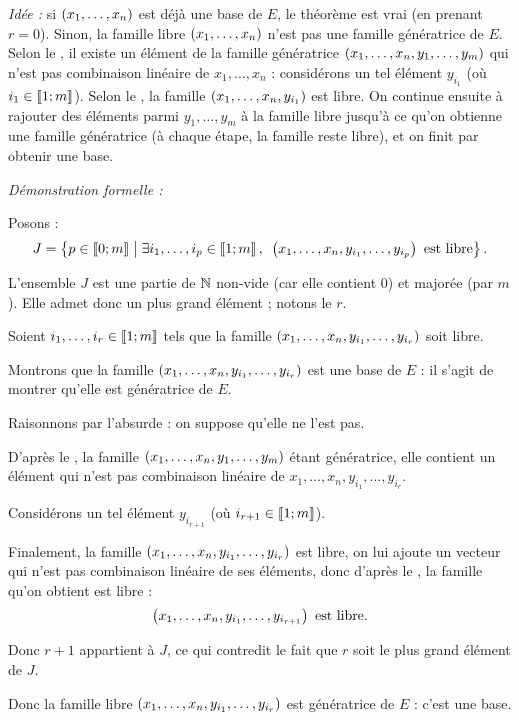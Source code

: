 \begin{dem}
\textit{Idée :} si \(\left(x_1,\dots,x_n\right)\) est déjà une base de \(E\), le théorème est vrai (en prenant \(r=0\)). Sinon, la famille libre \(\left(x_1,\dots,x_n\right)\) n'est pas une famille génératrice de \(E\). Selon le , il existe un élément de la famille génératrice \(\left(x_1,\dots,x_n,y_1,\dots,y_m\right)\) qui n'est pas combinaison linéaire de \(x_1,\dots,x_n\) : considérons un tel élément \(y_{i_1}\) (où \(i_1\in\left\llbracket1;m\right\rrbracket\)). Selon le , la famille \(\left(x_1,\dots,x_n,y_{i_1}\right)\) est libre. On continue ensuite à rajouter des éléments parmi \(y_1,\dots,y_m\) à la famille libre jusqu'à ce qu'on obtienne une famille génératrice (à chaque étape, la famille reste libre), et on finit par obtenir une base.

\textit{Démonstration formelle :}

Posons : \[J=\accol{p\in\interventierii{0}{m}\tq\quantifs{\exists i_1,\dots,i_p\in\interventierii{1}{m}}\paren{x_1,\dots,x_n,y_{i_1},\dots,y_{i_p}}\text{ est libre}}.\]

L'ensemble \(J\) est une partie de \(\mathbb{N}\) non-vide (car elle contient \(0\)) et majorée (par \(m\)). Elle admet donc un plus grand élément ; notons le \(r\).

Soient \(i_1,\dots,i_r\in\left\llbracket1;m\right\rrbracket\) tels que la famille \(\left(x_1,\dots,x_n,y_{i_1},\dots,y_{i_r}\right)\) soit libre.

Montrons que la famille \(\left(x_1,\dots,x_n,y_{i_1},\dots,y_{i_r}\right)\) est une base de \(E\) : il s'agit de montrer qu'elle est génératrice de \(E\).

Raisonnons par l'absurde : on suppose qu'elle ne l'est pas.

D'après le , la famille \(\left(x_1,\dots,x_n,y_1,\dots,y_m\right)\) étant génératrice, elle contient un élément qui n'est pas combinaison linéaire de \(x_1,\dots,x_n,y_{i_1},\dots,y_{i_r}\).

Considérons un tel élément \(y_{i_{r+1}}\) (où \(i_{r+1}\in\left\llbracket1;m\right\rrbracket\)).

Finalement, la famille \(\left(x_1,\dots,x_n,y_{i_1},\dots,y_{i_r}\right)\) est libre, on lui ajoute un vecteur qui n'est pas combinaison linéaire de ses éléments, donc d'après le , la famille qu'on obtient est libre : \[\left(x_1,\dots,x_n,y_{i_1},\dots,y_{i_{r+1}}\right)\text{ est libre}.\]

Donc \(r+1\) appartient à \(J\), ce qui contredit le fait que \(r\) soit le plus grand élément de \(J\).

Donc la famille libre \(\left(x_1,\dots,x_n,y_{i_1},\dots,y_{i_r}\right)\) est génératrice de \(E\) : c'est une base.
\end{dem}


